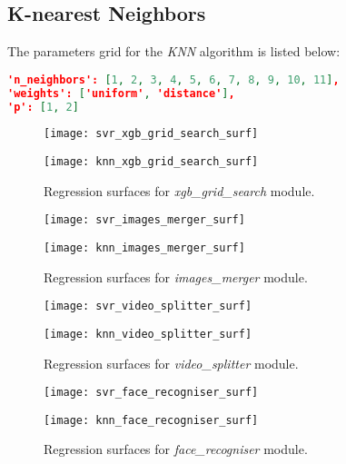 \begin{enumerate}
	\subsection{K-nearest Neighbors}
	The parameters grid for the \textit{KNN} algorithm is listed below:
	\begin{lstlisting}[language=json,firstnumber=1]
'n_neighbors': [1, 2, 3, 4, 5, 6, 7, 8, 9, 10, 11], 
'weights': ['uniform', 'distance'], 
'p': [1, 2]
	\end{lstlisting}
	
	\begin{figure*}[!t]
		\centering
		\begin{minipage}{0.45\linewidth}
			\texttt{[image: svr\_xgb\_grid\_search\_surf]}
		\end{minipage}
		\begin{minipage}{0.45\linewidth}
			\texttt{[image: knn\_xgb\_grid\_search\_surf]}
		\end{minipage}
		\caption{Regression surfaces for \textit{xgb\_grid\_search} module.}
		\label{fig:curve}
	\end{figure*}

\begin{figure*}[!t]
	\centering
	\begin{minipage}{0.45\linewidth}
		\texttt{[image: svr\_images\_merger\_surf]}
	\end{minipage}
	\begin{minipage}{0.45\linewidth}
		\texttt{[image: knn\_images\_merger\_surf]}
	\end{minipage}
	\caption{Regression surfaces for \textit{images\_merger} module.}
	\label{fig:curve}
\end{figure*}

\begin{figure*}[!t]
	\centering
	\begin{minipage}{0.45\linewidth}
		\texttt{[image: svr\_video\_splitter\_surf]}
	\end{minipage}
	\begin{minipage}{0.45\linewidth}
		\texttt{[image: knn\_video\_splitter\_surf]}
	\end{minipage}
	\caption{Regression surfaces for \textit{video\_splitter} module.}
	\label{fig:curve}
\end{figure*}

\begin{figure*}[!t]
	\centering
	\begin{minipage}{0.45\linewidth}
		\texttt{[image: svr\_face\_recogniser\_surf]}
	\end{minipage}
	\begin{minipage}{0.45\linewidth}
		\texttt{[image: knn\_face\_recogniser\_surf]}
	\end{minipage}
	\caption{Regression surfaces for \textit{face\_recogniser} module.}
	\label{fig:curve}
\end{figure*}
		

\end{enumerate}
